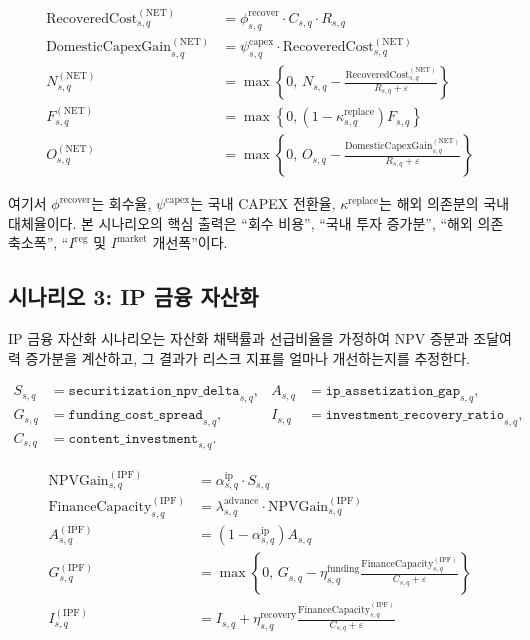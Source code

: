 \documentclass[11pt,a4paper]{report}
\begin{document}
\begin{align}
\mathrm{RecoveredCost}^{(\mathrm{NET})}_{s,q} &=
\phi^{\mathrm{recover}}_{s,q} \cdot C_{s,q} \cdot R_{s,q} \\
\mathrm{DomesticCapexGain}^{(\mathrm{NET})}_{s,q} &=
\psi^{\mathrm{capex}}_{s,q} \cdot \mathrm{RecoveredCost}^{(\mathrm{NET})}_{s,q} \\
N^{(\mathrm{NET})}_{s,q} &= \max\!\left\{0,\,
N_{s,q} - \frac{\mathrm{RecoveredCost}^{(\mathrm{NET})}_{s,q}}{R_{s,q}+\varepsilon}\right\} \\
F^{(\mathrm{NET})}_{s,q} &= \max\!\left\{0,\left(1-\kappa^{\mathrm{replace}}_{s,q}\right)F_{s,q}\right\} \\
O^{(\mathrm{NET})}_{s,q} &= \max\!\left\{0,\,
O_{s,q} - \frac{\mathrm{DomesticCapexGain}^{(\mathrm{NET})}_{s,q}}{R_{s,q}+\varepsilon}\right\}
\end{align}

여기서 $\phi^{\mathrm{recover}}$는 회수율, $\psi^{\mathrm{capex}}$는 국내 CAPEX 전환율, $\kappa^{\mathrm{replace}}$는 해외 의존분의 국내 대체율이다. 본 시나리오의 핵심 출력은 ``회수 비용'', ``국내 투자 증가분'', ``해외 의존 축소폭'', ``$I^{\mathrm{reg}}$ 및 $I^{\mathrm{market}}$ 개선폭''이다.

\subsection{시나리오 3: IP 금융 자산화}
IP 금융 자산화 시나리오는 자산화 채택률과 선급비율을 가정하여 NPV 증분과 조달여력 증가분을 계산하고, 그 결과가 리스크 지표를 얼마나 개선하는지를 추정한다.

\[
\begin{aligned}
S_{s,q} &= \texttt{securitization\_npv\_delta}_{s,q}, &
A_{s,q} &= \texttt{ip\_assetization\_gap}_{s,q}, \\
G_{s,q} &= \texttt{funding\_cost\_spread}_{s,q}, &
I_{s,q} &= \texttt{investment\_recovery\_ratio}_{s,q}, \\
C_{s,q} &= \texttt{content\_investment}_{s,q}. &&
\end{aligned}
\]

\begin{align}
\mathrm{NPVGain}^{(\mathrm{IPF})}_{s,q} &= \alpha^{\mathrm{ip}}_{s,q} \cdot S_{s,q} \\
\mathrm{FinanceCapacity}^{(\mathrm{IPF})}_{s,q} &= \lambda^{\mathrm{advance}}_{s,q} \cdot \mathrm{NPVGain}^{(\mathrm{IPF})}_{s,q} \\
A^{(\mathrm{IPF})}_{s,q} &= \left(1-\alpha^{\mathrm{ip}}_{s,q}\right)A_{s,q} \\
G^{(\mathrm{IPF})}_{s,q} &= \max\!\left\{0,\,
G_{s,q} - \eta^{\mathrm{funding}}_{s,q}
\frac{\mathrm{FinanceCapacity}^{(\mathrm{IPF})}_{s,q}}{C_{s,q}+\varepsilon}\right\} \\
I^{(\mathrm{IPF})}_{s,q} &= I_{s,q} + \eta^{\mathrm{recovery}}_{s,q}
\frac{\mathrm{FinanceCapacity}^{(\mathrm{IPF})}_{s,q}}{C_{s,q}+\varepsilon}
\end{align}
\end{document}

